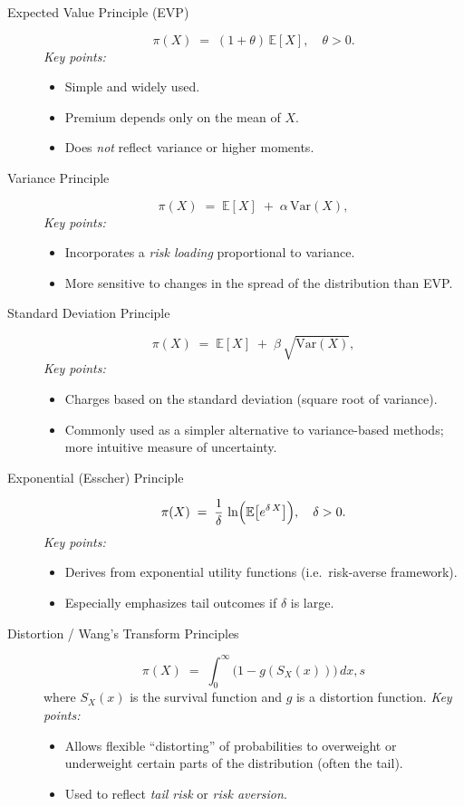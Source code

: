 \documentclass[13pt,a4paper]{article}
\begin{document}
\begin{description}
  \item[Expected Value Principle (EVP)] 
  \[
    \pi(X) \;=\; (1 + \theta)\,\mathbb{E}[X], \quad \theta > 0.
  \]
  \emph{Key points:}
  \begin{itemize}
    \item Simple and widely used.
    \item Premium depends only on the mean of \(X\).
    \item Does \emph{not} reflect variance or higher moments.
  \end{itemize}

  \item[Variance Principle]
  \[
    \pi(X) \;=\; \mathbb{E}[X] \;+\; \alpha\,\mathrm{Var}(X),
  \]
  \emph{Key points:}
  \begin{itemize}
    \item Incorporates a \emph{risk loading} proportional to variance.
    \item More sensitive to changes in the spread of the distribution than EVP.
  \end{itemize}

  \item[Standard Deviation Principle]
  \[
    \pi(X) \;=\; \mathbb{E}[X] \;+\; \beta\,\sqrt{\mathrm{Var}(X)},
  \]
  \emph{Key points:}
  \begin{itemize}
    \item Charges based on the standard deviation (square root of variance).
    \item Commonly used as a simpler alternative to variance-based methods; more intuitive measure of uncertainty.
  \end{itemize}

  \item[Exponential (Esscher) Principle]
  \[
    \pi(X) \;=\; \frac{1}{\delta} \,\ln \Bigl(\mathbb{E}\bigl[e^{\delta\,X}\bigr]\Bigr), \quad \delta > 0.
  \]
  \emph{Key points:}
  \begin{itemize}
    \item Derives from exponential utility functions (i.e.\ risk-averse framework).
    \item Especially emphasizes tail outcomes if \(\delta\) is large.
  \end{itemize}

  \item[Distortion / Wang's Transform Principles]
  \[
    \pi(X) \;=\; \int_{0}^{\infty} \bigl(1 - g(S_X(x))\bigr) \,dx, s
  \]
  where \(S_X(x)\) is the survival function and \(g\) is a distortion function.
  \emph{Key points:}
  \begin{itemize}
    \item Allows flexible “distorting” of probabilities to overweight or underweight certain parts of the distribution (often the tail).
    \item Used to reflect \emph{tail risk} or \emph{risk aversion}.
  \end{itemize}
\end{description}
\end{document}
